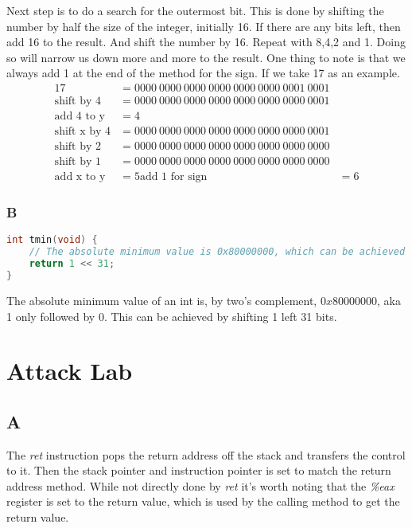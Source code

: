 \documentclass[11pt]{report}
\begin{document}
Next step is to do a search for the outermost bit. This is done by shifting the number by half the size of the integer, initially 16. If there are any bits left, then add 16 to the result. And shift the number by 16. Repeat with 8,4,2 and 1. Doing so will narrow us down more and more to the result. One thing to note is that we always add 1 at the end of the method for the sign. If we take 17 as an example. 
\begin{align*}
    17 &= 0000\ 0000\ 0000\ 0000\ 0000\ 0000\ 0001\ 0001\\
    \text{shift by 4} &= 0000\ 0000\ 0000\ 0000\ 0000\ 0000\ 0000\ 0001\\
    \text{add 4 to y} &= 4\\
    \text{shift x by 4} &= 0000\ 0000\ 0000\ 0000\ 0000\ 0000\ 0000\ 0001\\
    \text{shift by 2} &= 0000\ 0000\ 0000\ 0000\ 0000\ 0000\ 0000\ 0000\\
    \text{shift by 1} &= 0000\ 0000\ 0000\ 0000\ 0000\ 0000\ 0000\ 0000\\
    \text{add x to y} &= 5
    \text{add 1 for sign} &= 6
\end{align*}

\subsection{B}
\begin{lstlisting}[language=C]
int tmin(void) {
    // The absolute minimum value is 0x80000000, which can be achieved by shifting 1 left 31 bits.
    return 1 << 31;
}
\end{lstlisting}

The absolute minimum value of an int is, by two's complement, $0x80000000$, aka 1 only followed by 0. This can be achieved by shifting 1 left 31 bits.


\chapter{Attack Lab}
\section{A}
The \textit{ret} instruction pops the return address off the stack and transfers the control to it. Then the stack pointer and instruction pointer is set to match the return address method. While not directly done by \textit{ret} it's worth noting that the \textit{\%eax} register is set to the return value, which is used by the calling method to get the return value.
\end{document}
